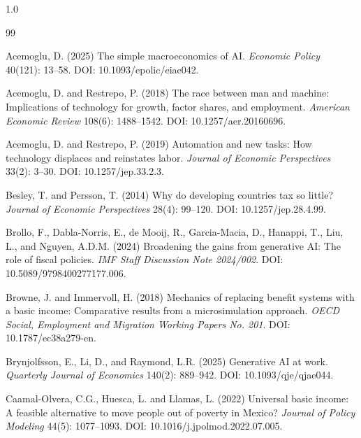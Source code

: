 \documentclass[11pt,a4paper]{article}
\begin{document}
\begin{spacing}{1.0}
\begin{thebibliography}{99}

Acemoglu, D. (2025)
\newblock The simple macroeconomics of AI.
\newblock \emph{Economic Policy} 40(121): 13--58. DOI: 10.1093/epolic/eiae042.

Acemoglu, D. and Restrepo, P. (2018)
\newblock The race between man and machine: Implications of technology for growth, factor shares, and employment.
\newblock \emph{American Economic Review} 108(6): 1488--1542. DOI: 10.1257/aer.20160696.

Acemoglu, D. and Restrepo, P. (2019)
\newblock Automation and new tasks: How technology displaces and reinstates labor.
\newblock \emph{Journal of Economic Perspectives} 33(2): 3--30. DOI: 10.1257/jep.33.2.3.

Besley, T. and Persson, T. (2014)
\newblock Why do developing countries tax so little?
\newblock \emph{Journal of Economic Perspectives} 28(4): 99--120. DOI: 10.1257/jep.28.4.99.

Brollo, F., Dabla-Norris, E., de Mooij, R., Garcia-Macia, D., Hanappi, T., Liu, L., and Nguyen, A.D.M. (2024)
\newblock Broadening the gains from generative AI: The role of fiscal policies.
\newblock \emph{IMF Staff Discussion Note 2024/002}. DOI: 10.5089/9798400277177.006.

Browne, J. and Immervoll, H. (2018)
\newblock Mechanics of replacing benefit systems with a basic income: Comparative results from a microsimulation approach.
\newblock \emph{OECD Social, Employment and Migration Working Papers No. 201}. DOI: 10.1787/ec38a279-en.

Brynjolfsson, E., Li, D., and Raymond, L.R. (2025)
\newblock Generative AI at work.
\newblock \emph{Quarterly Journal of Economics} 140(2): 889--942. DOI: 10.1093/qje/qjae044.

Caamal-Olvera, C.G., Huesca, L. and Llamas, L. (2022)
\newblock Universal basic income: A feasible alternative to move people out of poverty in Mexico?
\newblock \emph{Journal of Policy Modeling} 44(5): 1077--1093. DOI: 10.1016/j.jpolmod.2022.07.005.


\end{thebibliography}
\end{spacing}
\end{document}
